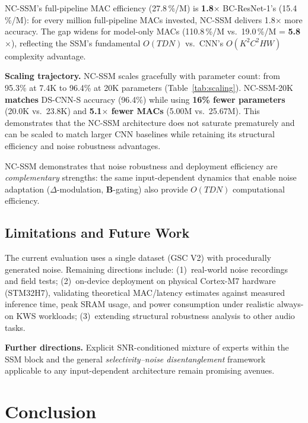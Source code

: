\documentclass[journal]{IEEEtran}
\begin{document}
NC-SSM's full-pipeline MAC efficiency (27.8\,\%/M) is \textbf{1.8$\times$} BC-ResNet-1's (15.4\,\%/M): for every million full-pipeline MACs invested, NC-SSM delivers 1.8$\times$ more accuracy.
The gap widens for model-only MACs (110.8\,\%/M vs.\ 19.0\,\%/M = \textbf{5.8$\times$}), reflecting the SSM's fundamental $O(TDN)$ vs.\ CNN's $O(K^2C^2HW)$ complexity advantage.

\smallskip\noindent\textbf{Scaling trajectory.}
NC-SSM scales gracefully with parameter count: from 95.3\% at 7.4K to 96.4\% at 20K parameters (Table~\ref{tab:scaling}).
NC-SSM-20K \textbf{matches} DS-CNN-S accuracy (96.4\%) while using \textbf{16\% fewer parameters} (20.0K vs.\ 23.8K) and \textbf{5.1$\times$ fewer MACs} (5.00M vs.\ 25.67M).
This demonstrates that the NC-SSM architecture does not saturate prematurely and can be scaled to match larger CNN baselines while retaining its structural efficiency and noise robustness advantages.

NC-SSM demonstrates that noise robustness and deployment efficiency are \emph{complementary} strengths: the same input-dependent dynamics that enable noise adaptation ($\Delta$-modulation, $\mathbf{B}$-gating) also provide $O(TDN)$ computational efficiency.

\subsection{Limitations and Future Work}
\label{sec:limitations}

The current evaluation uses a single dataset (GSC V2) with procedurally generated noise.
Remaining directions include:
(1)~real-world noise recordings and field tests;
(2)~on-device deployment on physical Cortex-M7 hardware (STM32H7), validating theoretical MAC/latency estimates against measured inference time, peak SRAM usage, and power consumption under realistic always-on KWS workloads;
(3)~extending structural robustness analysis to other audio tasks.

\smallskip\noindent\textbf{Further directions.}
Explicit SNR-conditioned mixture of experts within the SSM block and the general \emph{selectivity--noise disentanglement} framework applicable to any input-dependent architecture remain promising avenues.


\section{Conclusion}
\label{sec:conclusion}
\end{document}
